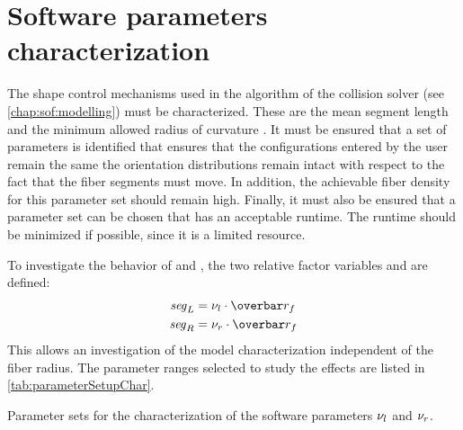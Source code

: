 \section{Software parameters characterization}\label{sec:modelSetup}
%
The shape control mechanisms used in the algorithm of the collision solver  (see \cref{chap:sof:modelling}) must be characterized.
These are the mean segment length \segLength{} and the minimum allowed radius of curvature \segRadius{}.
It must be ensured that a set of parameters is identified that ensures that the configurations entered by the user remain the same \ie{} the orientation distributions remain intact with respect to the fact that the fiber segments must move.
In addition, the achievable fiber density for this parameter set should remain high.
Finally, it must also be ensured that a parameter set can be chosen that has an acceptable runtime.
The runtime should be minimized if possible, since it is a limited resource.
\par
%
To investigate the behavior of \segLength{} and \segRadius{}, the two relative factor variables \segLengthFactor{} and \segRadiusFactor{} are defined:
\begin{align}
    \begin{split}
        \segLength &= \segLengthFactor \cdot \fiberRadiusMean\\
        \segRadius &= \segRadiusFactor \cdot \fiberRadiusMean
    \end{split}
\end{align}
This allows an investigation of the model characterization independent of the fiber radius.
The parameter ranges selected to study the effects are listed in \cref{tab:parameterSetupChar}.
%
\begin{table}[!b]
%
\centering
{}
\caption{Parameter sets for the characterization of the software parameters $\textnormal{$\nu_{l}$}$ and $\textnormal{$\nu_{r}$}$.}
\label{tab:parameterSetupChar}
\end{table}
